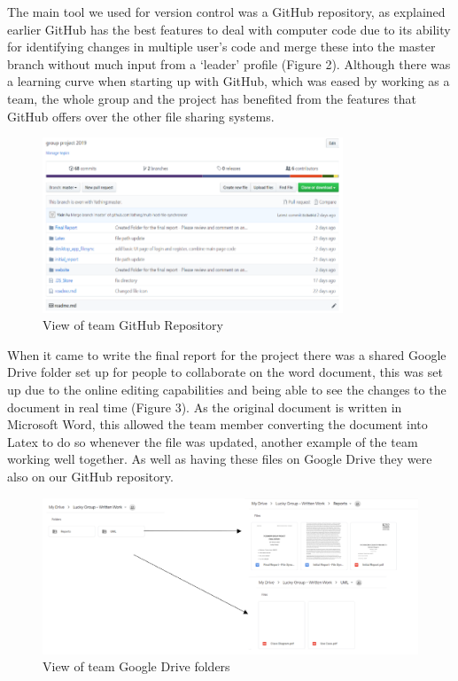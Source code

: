 \documentclass[11pt]{article}
\begin{document}
The main tool we used for version control was a GitHub repository, as explained earlier GitHub has the best features to deal with computer code due to its ability for identifying changes in multiple user’s code and merge these into the master branch without much input from a ‘leader’ profile (Figure 2). Although there was a learning curve when starting up with GitHub, which was eased by working as a team, the whole group and the project has benefited from the features that GitHub offers over the other file sharing systems.

\begin{figure} [h!]
\caption{View of team GitHub Repository}
\centering
\includegraphics[width=0.8\textwidth]{figure1-1.PNG}
\end{figure}

When it came to write the final report for the project there was a shared Google Drive folder set up for people to collaborate on the word document, this was set up due to the online editing capabilities and being able to see the changes to the document in real time (Figure 3). As the original document is written in Microsoft Word, this allowed the team member converting the document into Latex to do so whenever the file was updated, another example of the team working well together. As well as having these files on Google Drive they were also on our GitHub repository.

\begin{figure} [h!]
\caption{View of team Google Drive folders}
\centering
\includegraphics[width=1.0\textwidth]{figure2.PNG}
\end{figure}
\end{document}
